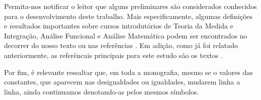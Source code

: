 Permita-nos notificar o leitor que alguns preliminares são considerados conhecidos para o desenvolvimento deste trabalho. Mais especificamente, algumas definições e resultados importantes sobre cursos introdutórios de Teoria da Medida e Integração, Análise Funcional e Análise Matemática podem ser encontrados no decorrer do nosso texto ou nas referências \cite{axler-measure.theory, bartle-measure.theory, brezis-functional.analysis, folland-real.analysis,kreyszig-functional.analysis, elon-analise.rn, elon-espacos.metricos, munkres-analysis.on.manifolds}. Em adição, como já foi relatado anteriormente, as referêncais principais para este estudo são os textos \cite{adams-sobolev, evans-pde,zingano-edp}.

Por fim, é relevante ressaltar que, em toda a monografia, mesmo se o valores das constantes, que aparecem nas desigualdades ou igualdades, mudarem linha a linha, ainda continuamos denotando-as pelos mesmos símbolos.